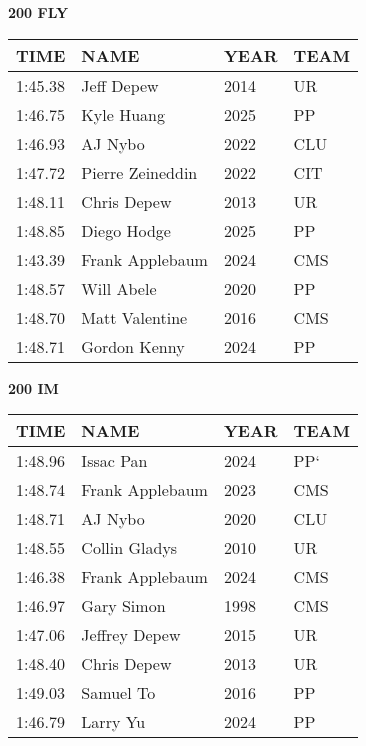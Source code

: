\begin{minipage}[t]{0.48\textwidth}
\centering
\textbf{200 FLY}\\[0.05cm]
\begin{tabular}{@{}p{1.8cm}p{2.8cm}p{1.2cm}p{1.4cm}@{}}
\hline
\textbf{TIME} & \textbf{NAME} & \textbf{YEAR} & \textbf{TEAM} \\
\hline
1:45.38 & Jeff Depew & 2014 & UR \\
1:46.75 & Kyle Huang & 2025 & PP \\
1:46.93 & AJ Nybo & 2022 & CLU \\
1:47.72 & Pierre Zeineddin & 2022 & CIT \\
1:48.11 & Chris Depew & 2013 & UR \\
1:48.85 & Diego Hodge & 2025 & PP \\
1:43.39 & Frank Applebaum & 2024 & CMS \\
1:48.57 & Will Abele & 2020 & PP \\
1:48.70 & Matt Valentine & 2016 & CMS \\
1:48.71 & Gordon Kenny & 2024 & PP \\
\hline
\end{tabular}
\end{minipage}\hfill
\begin{minipage}[t]{0.48\textwidth}
\centering
\textbf{200 IM}\\[0.05cm]
\begin{tabular}{@{}p{1.8cm}p{2.8cm}p{1.2cm}p{1.4cm}@{}}
\hline
\textbf{TIME} & \textbf{NAME} & \textbf{YEAR} & \textbf{TEAM} \\
\hline
1:48.96 & Issac Pan & 2024 & PP` \\
1:48.74 & Frank Applebaum & 2023 & CMS \\
1:48.71 & AJ Nybo & 2020 & CLU \\
1:48.55 & Collin Gladys & 2010 & UR \\
1:46.38 & Frank Applebaum & 2024 & CMS \\
1:46.97 & Gary Simon & 1998 & CMS \\
1:47.06 & Jeffrey Depew & 2015 & UR \\
1:48.40 & Chris Depew & 2013 & UR \\
1:49.03 & Samuel To & 2016 & PP \\
1:46.79 & Larry Yu & 2024 & PP \\
\hline
\end{tabular}
\end{minipage}

\vspace{0.4cm}

